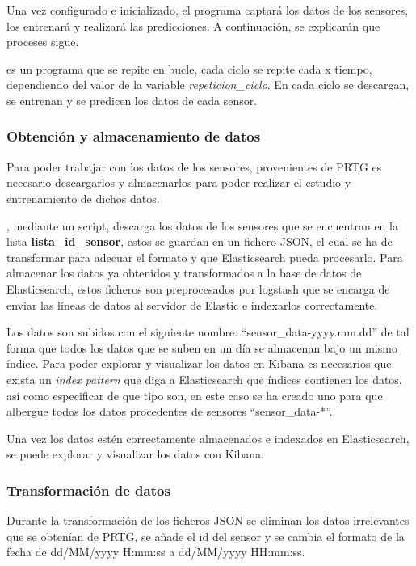 Una vez configurado e inicializado, el programa captará los datos de los sensores, los entrenará y realizará las predicciones. A continuación, se explicarán que proceses sigue. 

\nombrePrograma es un programa que se repite en bucle, cada ciclo se repite cada x tiempo, dependiendo del valor de la variable \textit{repeticion\_ciclo}. En cada ciclo se descargan, se entrenan y se predicen los datos de cada sensor. 

\subsubsection{Obtención y almacenamiento de datos}\label{cap:obt_alm_datos}

Para poder trabajar con los datos de los sensores, provenientes de PRTG es necesario descargarlos y almacenarlos para poder realizar el estudio y entrenamiento de dichos datos.

\nombrePrograma, mediante un script, descarga los datos de los sensores que se encuentran en la lista \textbf{lista\_id\_sensor}, estos se guardan en un fichero JSON, el cual se ha de transformar para adecuar el formato y que Elasticsearch pueda procesarlo. Para almacenar los datos ya obtenidos y transformados a la base de datos de Elasticsearch, estos ficheros son preprocesados por logstash que se encarga de enviar las líneas de datos al servidor de Elastic e indexarlos correctamente.

Los datos son subidos con el siguiente nombre: ``sensor\_data-yyyy.mm.dd'' de tal forma que todos los datos que se suben en un día se almacenan bajo un mismo índice. Para poder explorar y visualizar los datos en Kibana es necesarios que exista un \textit{index pattern} que diga a Elasticsearch que índices contienen los datos, así como especificar de que tipo son, en este caso se ha creado uno para que albergue todos los datos procedentes de sensores ``sensor\_data-*''. 

Una vez los datos estén correctamente almacenados e indexados en Elasticsearch, se puede explorar y visualizar los datos con Kibana.


\newpage
\subsubsection{Transformación de datos}\label{cap:TransformacionDatos}

Durante la transformación de los ficheros JSON se eliminan los datos irrelevantes que se obtenían de PRTG, se añade el id del sensor y se cambia el formato de la fecha de dd/MM/yyyy H:mm:ss a dd/MM/yyyy HH:mm:ss.

